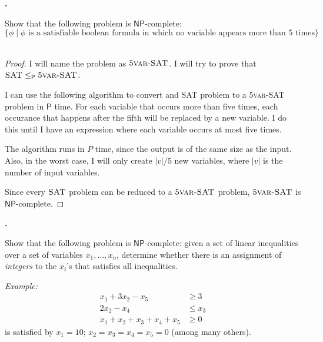 \documentclass[letterpaper,11pt]{article}
\newcommand{\cc}[1]{\ensuremath{\textsf{#1}}\xspace}
\renewcommand{\P}{\cc{P}}
\newcommand{\NP}{\cc{NP}}
\newcommand{\karp}{\le_{\textsf{P}}}
\newcounter{problem}
\newenvironment{problem}%
{%
	\stepcounter{problem}%
	\textbf{\theproblem.}
	\large
}{\\}%
\begin{document}
\begin{problem}
Show that the following problem is \NP-complete:
\[
    \{ \phi \mid \phi \mbox{ is a satisfiable boolean formula in which no variable appears more than 5 times}\}
\]
\end{problem}

\begin{proof}
I will name the problem as $\textsc{5var-SAT}$.
I will try to prove that $\textsc{SAT} \karp \textsc{5var-SAT}$.

I can use the following algorithm to convert and \textsc{SAT} problem to a \textsc{5var-SAT} problem in $\P$ time.
For each variable that occurs more than five times, each occurance that happens after the fifth will be replaced by a new variable.
I do this until I have an expression where each variable occurs at most five times.

The algorithm runs in $P$ time, since the output is of the same size as the input.
Also, in the worst case, I will only create $|v| / 5$ new variables, where $|v|$ is the number of input variables.

Since every $\textsc{SAT}$ problem can be reduced to a $\textsc{5var-SAT}$ problem, $\textsc{5var-SAT}$ is $\NP$-complete.
\end{proof}

\begin{problem}
Show that the following problem is \NP-complete: given a set of linear inequalities over a set of variables $x_1, \ldots, x_n$, determine whether there is an assignment of {\em integers} to the $x_i$'s that satisfies all inequalities.

{\em Example:}
\begin{align*}
    x_1 + 3x_2 - x_5 &\ge 3 \\
    2x_2 - x_4 &\le x_3 \\
    x_1 + x_2 + x_3 + x_4 + x_5 &\ge 0
\end{align*}
is satisfied by $x_1 = 10$; $x_2 = x_3 = x_4 = x_5 = 0$ (among many others).
\end{problem}
\end{document}
